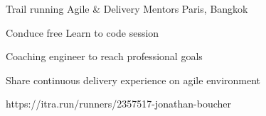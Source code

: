 

\begin{cventries}

  \cventry
    {Trail running} %
    {Agile \& Delivery Mentors} %
    {Paris, Bangkok} %
    {
      \begin{cvitems} %
        \item {Conduce free Learn to code session}
        \item {Coaching engineer to reach professional goals}
        \item {Share continuous delivery experience on  agile environment}
      \end{cvitems}
    }
    { } %


\end{cventries}





https://itra.run/runners/2357517-jonathan-boucher
